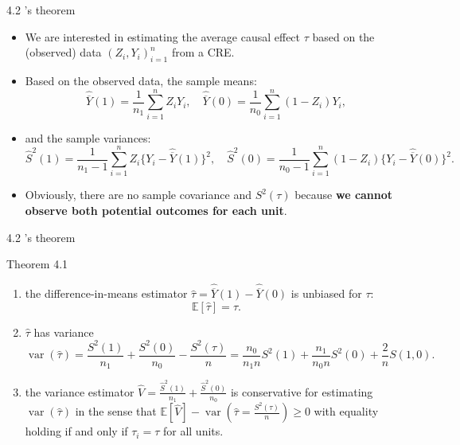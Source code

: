 \documentclass[aspectratio=169, 12pt]{beamer}
\begin{document}
\begin{frame}{4.2 \citet{neyman1923application}'s theorem}
  \begin{itemize}
    \item We are interested in estimating the average causal effect $\tau$ based on the (observed) data $(Z_i, Y_i)_{i=1}^{n}$ from a CRE.
    \item Based on the observed data, the sample means:
    \[
    \widehat{\overline{Y}}(1) = \frac{1}{n_1}\sum_{i=1}^{n}Z_iY_i, \quad \widehat{\overline{Y}}(0) = \frac{1}{n_0}\sum_{i=1}^{n}(1-Z_i)Y_i,
    \]
    \item and the sample variances:
    \[
    \widehat{S}^2(1) = \frac{1}{n_1-1}\sum_{i=1}^{n}Z_i\{Y_i-\widehat{\overline{Y}}(1)\}^2, \quad \widehat{S}^2(0) = \frac{1}{n_0-1}\sum_{i=1}^{n}(1-Z_i)\{Y_i-\widehat{\overline{Y}}(0)\}^2.
    \]
    \item Obviously, there are no sample covariance and $S^2(\tau)$ because \textbf{we cannot observe both potential outcomes for each unit}.
  \end{itemize}
\end{frame}

\begin{frame}{4.2 \citet{neyman1923application}'s theorem}
  \begin{keybox}{Theorem 4.1}
    \begin{enumerate}
      \item the difference-in-means estimator $\widehat{\tau}=\widehat{\overline{Y}}(1)-\widehat{\overline{Y}}(0)$ is unbiased for $\tau$:$$\mathbb{E}[\widehat{\tau}]=\tau.$$
      \item $\widehat{\tau}$ has variance
      \[
      \operatorname{var}(\widehat{\tau}) = \frac{S^2(1)}{n_1} + \frac{S^2(0)}{n_0} - \frac{S^2(\tau)}{n} = \frac{n_0}{n_1n}S^2(1)+\frac{n_1}{n_0n}S^2(0) + \frac{2}{n}S(1,0).
      \]
      \item the variance estimator $\widehat{V} = \frac{\widehat{S}^2(1)}{n_1} + \frac{\widehat{S}^2(0)}{n_0}$ is conservative for estimating $\operatorname{var}(\widehat{\tau})$ in the sense that $\mathbb{E}[\widehat{V}]-\operatorname{var}(\widehat{\tau}=\frac{S^2(\tau)}{n})\geq0$ with equality holding if and only if $\tau_i=\tau$ for all units.
    \end{enumerate}
  \end{keybox}
\end{frame}
\end{document}
